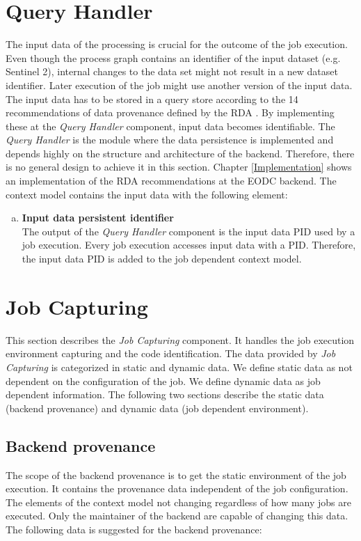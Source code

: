 \documentclass[draft,final]{vutinfth} %
\begin{document}
\section{Query Handler}\label{Design:Data Identification}
The input data of the processing is crucial for the outcome of the job execution. Even though the process graph contains an identifier of the input dataset (e.g. Sentinel 2), internal changes to the data set might not result in a new dataset identifier. Later execution of the job might use another version of the input data. The input data has to be stored in a query store according to the 14 recommendations of data provenance defined by the RDA \cite{rauber2016identification}. By implementing these at the \textit{Query Handler} component, input data becomes identifiable. The \textit{Query Handler} is the module where the data persistence is implemented and depends highly on the structure and architecture of the backend. Therefore, there is no general design to achieve it in this section. Chapter \ref{Implementation} shows an implementation of the RDA recommendations at the EODC backend. The context model contains the input data with the following element: 

\begin{enumerate}[(a)]
\item \textbf{Input data persistent identifier} \\
	The output of the \textit{Query Handler} component is the input data PID used by a job execution. Every job execution accesses input data with a PID. Therefore, the input data PID is added to the job dependent context model. 
\end{enumerate}

\section{Job Capturing}\label{Design:Job Capturing}
This section describes the \textit{Job Capturing} component. It handles the job execution environment capturing and the code identification. The data provided by \textit{Job Capturing} is categorized in static and dynamic data. We define static data as not dependent on the configuration of the job. We define dynamic data as job dependent information. The following two sections describe the static data (backend provenance) and dynamic data (job dependent environment).

\subsection{Backend provenance}\label{Design:Backend provenance}
The scope of the backend provenance is to get the static environment of the job execution. It contains the provenance data independent of the job configuration. The elements of the context model not changing regardless of how many jobs are executed. Only the maintainer of the backend are capable of changing this data. The following data is suggested for the backend provenance:
\end{document}

